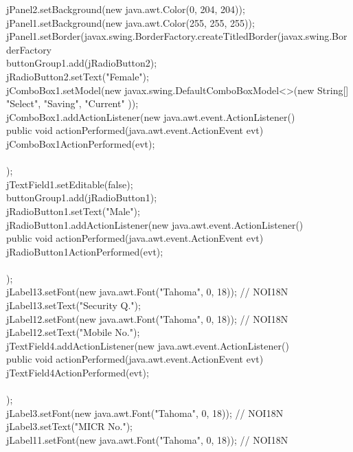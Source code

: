 {{jPanel2.setBackground(new java.awt.Color(0, 204, 204));\\
jPanel1.setBackground(new java.awt.Color(255, 255, 255));\\
jPanel1.setBorder(javax.swing.BorderFactory.createTitledBorder(javax.swing.BorderFactory\\
buttonGroup1.add(jRadioButton2);\\
jRadioButton2.setText("Female");\\
jComboBox1.setModel(new javax.swing.DefaultComboBoxModel<>(new String[] {\\
"Select", "Saving", "Current" }));\\
jComboBox1.addActionListener(new java.awt.event.ActionListener() {\\
public void actionPerformed(java.awt.event.ActionEvent evt) {\\
jComboBox1ActionPerformed(evt);\\
}\\
});\\
jTextField1.setEditable(false);\\
buttonGroup1.add(jRadioButton1);\\
jRadioButton1.setText("Male");\\
jRadioButton1.addActionListener(new java.awt.event.ActionListener() {\\
public void actionPerformed(java.awt.event.ActionEvent evt) {\\
jRadioButton1ActionPerformed(evt);\\
}\\
});\\
jLabel13.setFont(new java.awt.Font("Tahoma", 0, 18)); // NOI18N\\
jLabel13.setText("Security Q.");\\
jLabel12.setFont(new java.awt.Font("Tahoma", 0, 18)); // NOI18N\\
jLabel12.setText("Mobile No.");\\
jTextField4.addActionListener(new java.awt.event.ActionListener() {\\
public void actionPerformed(java.awt.event.ActionEvent evt) {\\
jTextField4ActionPerformed(evt);\\
}\\
});\\
jLabel3.setFont(new java.awt.Font("Tahoma", 0, 18)); // NOI18N\\
jLabel3.setText("MICR No.");\\
jLabel11.setFont(new java.awt.Font("Tahoma", 0, 18)); // NOI18N\\
}}
